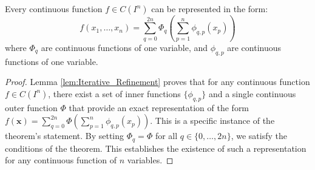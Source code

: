 \begin{theorem}
    \label{thm:Kolmogorov_Arnold}
    Every continuous function $f \in C(I^n)$ can be represented in the form:
    $$ f(x_1, \dots, x_n) = \sum_{q=0}^{2n} \Phi_q\left(\sum_{p=1}^n \phi_{q,p}(x_p)\right) $$
    where $\Phi_q$ are continuous functions of one variable, and $\phi_{q,p}$ are continuous functions of one variable.
\end{theorem}

\begin{proof}
    Lemma \ref{lem:Iterative_Refinement} proves that for any continuous function $f \in C(I^n)$, there exist a set of inner functions $\{\phi_{q,p}\}$ and a single continuous outer function $\Phi$ that provide an exact representation of the form $f(\mathbf{x}) = \sum_{q=0}^{2n} \Phi\left(\sum_{p=1}^n \phi_{q,p}(x_p)\right)$.
    This is a specific instance of the theorem's statement. By setting $\Phi_q = \Phi$ for all $q \in \{0, \dots, 2n\}$, we satisfy the conditions of the theorem. This establishes the existence of such a representation for any continuous function of $n$ variables.
\end{proof}
